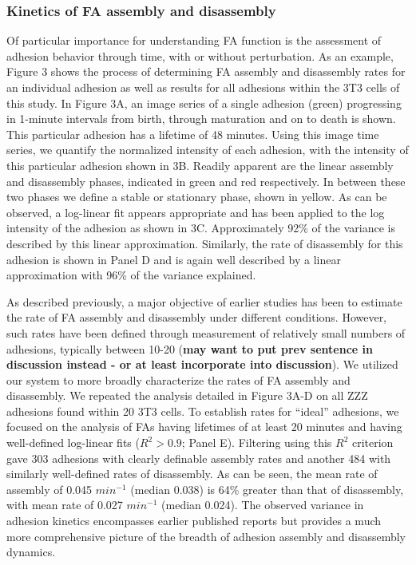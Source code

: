 \documentclass[10pt]{article}
\begin{document}
\subsubsection*{Kinetics of FA assembly and disassembly}
Of particular importance for understanding FA function is the assessment of
adhesion behavior through time, with or without perturbation. As an example,
Figure 3 shows the process of determining FA assembly and disassembly rates for
an individual adhesion as well as results for all adhesions within the 3T3 cells
of this study. In Figure 3A, an image series of a single adhesion (green)
progressing in 1-minute intervals from birth, through maturation and on to death
is shown.  This particular adhesion has a lifetime of 48 minutes. Using this
image time series, we quantify the normalized intensity of each adhesion, with
the intensity of this particular adhesion shown in 3B. Readily apparent are the
linear assembly and disassembly phases, indicated in green and red respectively.
In between these two phases we define a stable or stationary phase, shown in
yellow. As can be observed, a log-linear fit appears appropriate and has been
applied to the log intensity of the adhesion as shown in 3C. Approximately 92\%
of the variance is described by this linear approximation. Similarly, the rate
of disassembly for this adhesion is shown in Panel D and is again well described
by a linear approximation with 96\% of the variance explained.

As described previously, a major objective of earlier studies has been to
estimate the rate of FA assembly and disassembly under different conditions.
However, such rates have been defined through measurement of relatively small
numbers of adhesions, typically between 10-20 (\textbf{may want to put prev
sentence in discussion instead - or at least incorporate into discussion}). We
utilized our system to more broadly characterize the rates of FA assembly and
disassembly. We repeated the analysis detailed in Figure 3A-D on all ZZZ
adhesions found within 20 3T3 cells. To establish rates for ``ideal'' adhesions,
we focused on the analysis of FAs having lifetimes of at least 20 minutes and
having well-defined log-linear fits ($R^2 > 0.9$; Panel E). Filtering using this
$R^2$ criterion gave 303 adhesions with clearly definable assembly rates and
another 484 with similarly well-defined rates of disassembly. As can be seen,
the mean rate of assembly of 0.045 $min^{-1}$ (median 0.038) is 64\% greater
than that of disassembly, with mean rate of 0.027 $min^{-1}$ (median 0.024). The
observed variance in adhesion kinetics encompasses earlier published reports but
provides a much more comprehensive picture of the breadth of adhesion assembly
and disassembly dynamics.
\end{document}
